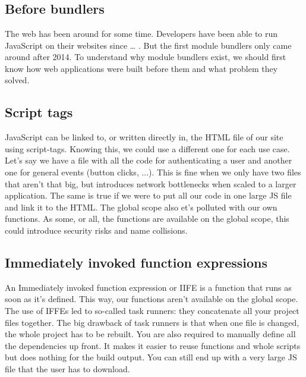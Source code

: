 \chapter{}
\label{ch:stand-van-zaken}




\section{Before bundlers}

The web has been around for some time. Developers have been able to run JavaScript on their websites since … . But the first module bundlers only came around after 2014. To understand why module bundlers exist, we should first know how web applications were built before them and what problem they solved.

\section{Script tags}
JavaScript can be linked to, or written directly in, the HTML file of our site using script-tags. Knowing this, we could use a different one for each use case. Let’s say we have a file with all the code for authenticating a user and another one for general events (button clicks, ...). This is fine when we only have two files that aren’t that big, but introduces network bottlenecks when scaled to a larger application. The same is true if we were to put all our code in one large JS file and link it to the HTML. The global scope also et’s polluted with our own functions. As some, or all, the functions are available on the global scope, this could introduce security risks and name collisions. 

\section{Immediately invoked function expressions}
An Immediately invoked function expression or IIFE is a function that runs as soon as it’s defined. This way, our functions aren’t available on the global scope. The use of IFFEs led to so-called task runners: they concatenate all your project files together. The big drawback of task runners is that when one file is changed, the whole project has to be rebuilt. You are also required to manually define all the dependencies up front. It makes it easier to reuse functions and whole scripts but does nothing for the build output. You can still end up with a very large JS file that the user has to download. 

